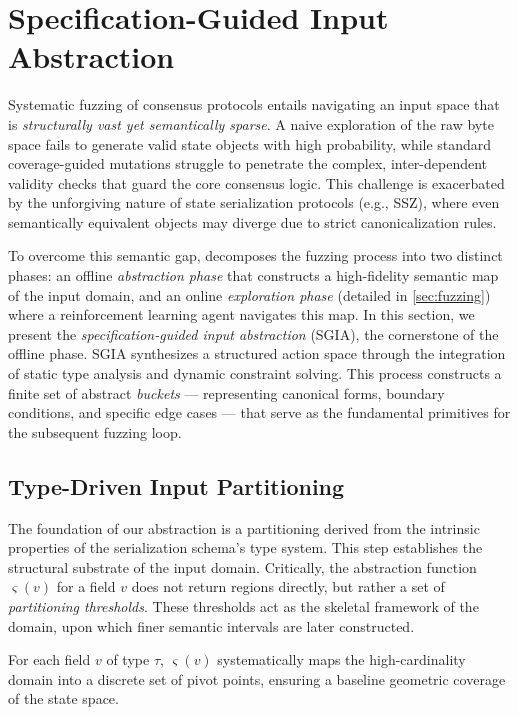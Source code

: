 \section{Specification-Guided Input Abstraction}\label{sec:inpabs}

Systematic fuzzing of consensus protocols entails navigating an input space that is \textit{structurally vast yet semantically sparse}. A naive exploration of the raw byte space fails to generate valid state objects with high probability, while standard coverage-guided mutations struggle to penetrate the complex, inter-dependent validity checks that guard the core consensus logic. This challenge is exacerbated by the unforgiving nature of state serialization protocols (e.g., SSZ), where even semantically equivalent objects may diverge due to strict canonicalization rules.

To overcome this semantic gap, \tool decomposes the fuzzing process into two distinct phases: an offline \textit{abstraction phase} that constructs a high-fidelity semantic map of the input domain, and an online \textit{exploration phase} (detailed in \autoref{sec:fuzzing}) where a reinforcement learning agent navigates this map. In this section, we present the \textit{specification-guided input abstraction} (SGIA), the cornerstone of the offline phase. SGIA synthesizes a structured action space through the integration of static type analysis and dynamic constraint solving. This process constructs a finite set of abstract \emph{buckets} --- representing canonical forms, boundary conditions, and specific edge cases --- that serve as the fundamental primitives for the subsequent fuzzing loop.

\subsection{Type-Driven Input Partitioning}
\label{sec:type_partition}

The foundation of our abstraction is a partitioning derived from the intrinsic properties of the serialization schema's type system. This step establishes the structural substrate of the input domain.
Critically, the abstraction function $\varsigma(v)$ for a field $v$ does not return regions directly, but rather a set of \textit{partitioning thresholds}. These thresholds act as the skeletal framework of the domain, upon which finer semantic intervals are later constructed.

For each field $v$ of type $\tau$, $\varsigma(v)$ systematically maps the high-cardinality domain into a discrete set of pivot points, ensuring a baseline geometric coverage of the state space.

